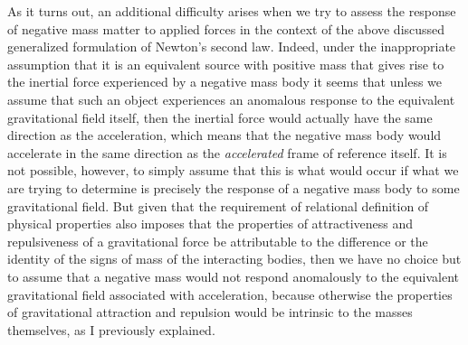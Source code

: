\documentclass[notitlepage,12pt]{report}
\begin{document}
As it turns out, an additional difficulty arises when we try to assess the response of negative mass matter to applied forces in the context of the above discussed generalized formulation of Newton's second law. Indeed, under the inappropriate assumption that it is an equivalent source with positive mass that gives rise to the inertial force experienced by a negative mass body it seems that unless we assume that such an object experiences an anomalous response to the equivalent gravitational field itself, then the inertial force would actually have the same direction as the acceleration, which means that the negative mass body would accelerate in the same direction as the \textit{accelerated} frame of reference itself. It is not possible, however, to simply assume that this is what would occur if what we are trying to determine is precisely the response of a negative mass body to some gravitational field. But given that the requirement of relational definition of physical properties also imposes that the properties of attractiveness and repulsiveness of a gravitational force be attributable to the difference or the identity of the signs of mass of the interacting bodies, then we have no choice but to assume that a negative mass would not respond anomalously to the equivalent gravitational field associated with acceleration, because otherwise the properties of gravitational attraction and repulsion would be intrinsic to the masses themselves, as I previously explained.
\end{document}
